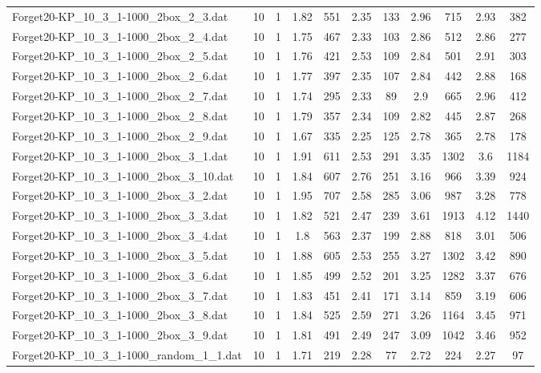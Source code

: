 \begin{table}[!ht]
\begin{tabular}{lcccccccccc}
Forget20-KP\_10\_3\_1-1000\_2box\_2\_3.dat & 10 & 1 & 1.82 & 551 & 2.35 & 133 & 2.96 & 715 & 2.93 & 382 \\
Forget20-KP\_10\_3\_1-1000\_2box\_2\_4.dat & 10 & 1 & 1.75 & 467 & 2.33 & 103 & 2.86 & 512 & 2.86 & 277 \\
Forget20-KP\_10\_3\_1-1000\_2box\_2\_5.dat & 10 & 1 & 1.76 & 421 & 2.53 & 109 & 2.84 & 501 & 2.91 & 303 \\
Forget20-KP\_10\_3\_1-1000\_2box\_2\_6.dat & 10 & 1 & 1.77 & 397 & 2.35 & 107 & 2.84 & 442 & 2.88 & 168 \\
Forget20-KP\_10\_3\_1-1000\_2box\_2\_7.dat & 10 & 1 & 1.74 & 295 & 2.33 & 89 & 2.9 & 665 & 2.96 & 412 \\
Forget20-KP\_10\_3\_1-1000\_2box\_2\_8.dat & 10 & 1 & 1.79 & 357 & 2.34 & 109 & 2.82 & 445 & 2.87 & 268 \\
Forget20-KP\_10\_3\_1-1000\_2box\_2\_9.dat & 10 & 1 & 1.67 & 335 & 2.25 & 125 & 2.78 & 365 & 2.78 & 178 \\
Forget20-KP\_10\_3\_1-1000\_2box\_3\_1.dat & 10 & 1 & 1.91 & 611 & 2.53 & 291 & 3.35 & 1302 & 3.6 & 1184 \\
Forget20-KP\_10\_3\_1-1000\_2box\_3\_10.dat & 10 & 1 & 1.84 & 607 & 2.76 & 251 & 3.16 & 966 & 3.39 & 924 \\
Forget20-KP\_10\_3\_1-1000\_2box\_3\_2.dat & 10 & 1 & 1.95 & 707 & 2.58 & 285 & 3.06 & 987 & 3.28 & 778 \\
Forget20-KP\_10\_3\_1-1000\_2box\_3\_3.dat & 10 & 1 & 1.82 & 521 & 2.47 & 239 & 3.61 & 1913 & 4.12 & 1440 \\
Forget20-KP\_10\_3\_1-1000\_2box\_3\_4.dat & 10 & 1 & 1.8 & 563 & 2.37 & 199 & 2.88 & 818 & 3.01 & 506 \\
Forget20-KP\_10\_3\_1-1000\_2box\_3\_5.dat & 10 & 1 & 1.88 & 605 & 2.53 & 255 & 3.27 & 1302 & 3.42 & 890 \\
Forget20-KP\_10\_3\_1-1000\_2box\_3\_6.dat & 10 & 1 & 1.85 & 499 & 2.52 & 201 & 3.25 & 1282 & 3.37 & 676 \\
Forget20-KP\_10\_3\_1-1000\_2box\_3\_7.dat & 10 & 1 & 1.83 & 451 & 2.41 & 171 & 3.14 & 859 & 3.19 & 606 \\
Forget20-KP\_10\_3\_1-1000\_2box\_3\_8.dat & 10 & 1 & 1.84 & 525 & 2.59 & 271 & 3.26 & 1164 & 3.45 & 971 \\
Forget20-KP\_10\_3\_1-1000\_2box\_3\_9.dat & 10 & 1 & 1.81 & 491 & 2.49 & 247 & 3.09 & 1042 & 3.46 & 952 \\
Forget20-KP\_10\_3\_1-1000\_random\_1\_1.dat & 10 & 1 & 1.71 & 219 & 2.28 & 77 & 2.72 & 224 & 2.27 & 97 \\

\end{tabular}
\end{table}
